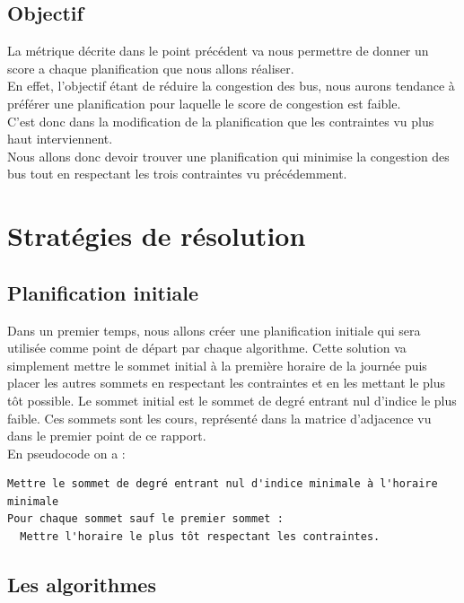 \documentclass[a4paper,11pt]{article}
\begin{document}
	\subsection{Objectif}
		La métrique décrite dans le point précédent va nous permettre de donner un score a chaque planification que nous allons réaliser.\\
		En effet, l'objectif étant de réduire la congestion des bus, nous aurons tendance à préférer une planification pour laquelle le score de congestion est faible.\\
		C'est donc dans la modification de la planification que les contraintes vu plus haut interviennent.\\
		Nous allons donc devoir trouver une planification qui minimise la congestion des bus tout en respectant les trois contraintes vu précédemment.
	
\section{Stratégies de résolution}
	\subsection{Planification initiale}
		Dans un premier temps, nous allons créer une planification initiale qui sera utilisée comme point de départ par chaque algorithme. Cette solution va simplement mettre le sommet initial à la première horaire de la journée puis placer les autres sommets en respectant les contraintes et en les mettant le plus tôt possible. Le sommet initial est le sommet de degré entrant nul d'indice le plus faible. Ces sommets sont les cours, représenté dans la matrice d'adjacence vu dans le premier point de ce rapport.\\
		En pseudocode on a :\\
		\begin{lstlisting}
Mettre le sommet de degré entrant nul d'indice minimale à l'horaire minimale
Pour chaque sommet sauf le premier sommet :
  Mettre l'horaire le plus tôt respectant les contraintes.
		\end{lstlisting}

	\subsection{Les algorithmes}
\end{document}
